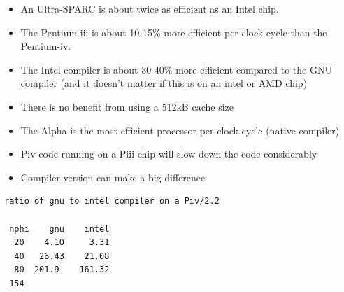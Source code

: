 \documentclass[10pt,dvips]{article}
\begin{document}
\begin{itemize}
\item An Ultra-SPARC is about twice as efficient as an Intel chip.

\item The Pentium-iii is about 10-15\% more efficient per clock cycle
than the Pentium-iv.

\item The Intel compiler is about 30-40\% more efficient compared
to the GNU compiler (and it doesn't matter if this is on an intel or AMD chip)

\item There is no benefit from using a 512kB cache size 

\item The Alpha is the most efficient processor per clock cycle (native compiler)

\item Piv code running on a Piii chip will slow down the code considerably

\item Compiler version can make a big difference

\end{itemize}

\begin{verbatim}
ratio of gnu to intel compiler on a Piv/2.2

 nphi    gnu    intel
  20    4.10     3.31
  40   26.43    21.08
  80  201.9    161.32
 154

\end{verbatim}
\end{document}

